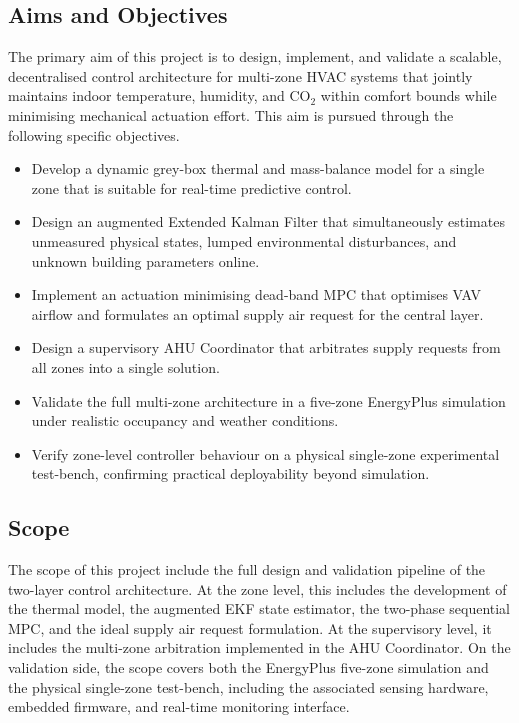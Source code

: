 \documentclass[12pt, a4paper]{article}
\begin{document}
	\newpage
	\subsection{Aims and Objectives}
	
	The primary aim of this project is to design, implement, and validate a scalable, decentralised control architecture for multi-zone HVAC systems that jointly maintains indoor temperature, humidity, and CO$_2$ within comfort bounds while minimising mechanical actuation effort. This aim is pursued through the following specific objectives.
	
	\begin{itemize}
		\item Develop a dynamic grey-box thermal and mass-balance model for a single zone that is suitable for real-time predictive control.
		\item Design an augmented Extended Kalman Filter that simultaneously estimates unmeasured physical states, lumped environmental disturbances, and unknown building parameters online.
		\item Implement an actuation minimising dead-band MPC that optimises VAV airflow and formulates an optimal supply air request for the central layer.
		\item Design a supervisory AHU Coordinator that arbitrates supply requests from all zones into a single solution.
		\item Validate the full multi-zone architecture in a five-zone EnergyPlus simulation under realistic occupancy and weather conditions.
		\item Verify zone-level controller behaviour on a physical single-zone experimental test-bench, confirming practical deployability beyond simulation.
	\end{itemize}
	
	\subsection{Scope}
	The scope of this project include the full design and validation pipeline of the two-layer control architecture. At the zone level, this includes the development of the thermal model, the augmented EKF state estimator, the two-phase sequential MPC, and the ideal supply air request formulation. At the supervisory level, it includes the multi-zone arbitration implemented in the AHU Coordinator. On the validation side, the scope covers both the EnergyPlus five-zone simulation and the physical single-zone test-bench, including the associated sensing hardware, embedded firmware, and real-time monitoring interface.
	
\end{document}
